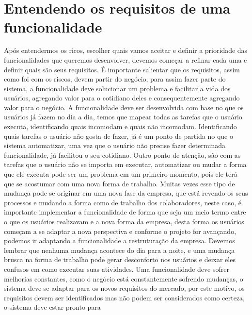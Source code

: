     \section{Entendendo os requisitos de uma funcionalidade}
      Após entendermos os ricos, escolher quais vamos aceitar e definir a prioridade
      das funcionalidades que queremos desenvolver, devemos começar a refinar cada
      uma e definir quais são seus requisitos. É importante salientar que os
      requisitos, assim como foi com os riscos, devem partir do negócio, para assim
      fazer parte do sistema, a funcionalidade deve solucionar um problema e facilitar
      a vida dos usuários, agregando valor para o cotidiano deles e consequentemente
      agregando valor para o negócio. \newline
      A funcionalidade deve ser desenvolvida com base no que os usuários já fazem
      no dia a dia, temos que mapear todas as tarefas que o usuário executa,
      identificando quais incomodam e quais não incomodam. Identificando quais tarefas
      o usuário não gosta de fazer, já é um ponto de partida no que o sistema
      automatizar, uma vez que o usuário não precise fazer determinada funcionalidade,
      já facilitou o seu cotidiano. Outro ponto de atenção, são com as tarefas que
      o usuário não se importa em executar, automatizar ou mudar a forma que ele
      executa pode ser um problema em um primeiro momento, pois ele terá que se
      acostumar com uma nova forma de trabalho. Muitas vezes esse tipo de mudança
      pode se originar em uma nova fase da empresa, que está revendo os seus processos
      e mudando a forma como de trabalho dos colaboradores, neste caso, é importante
      implementar a funcionalidade de forma que seja um meio termo entre o que os
      usuários realizavam e a nova forma da empresa, desta forma os usuários
      começam a se adaptar a nova perspectiva e conforme o projeto for avançando,
      podemos ir adaptando a funcionalidade a restruturação da empresa. Devemos
      lembrar que nenhuma mudança acontece do dia para a noite, e uma mudança
      brusca na forma de trabalho pode gerar desconforto nos usuários e deixar eles
      confusos em como executar suas atividades. \newline
      Uma funcionalidade deve sofrer melhorias constantes, como o negócio está
      constantemente sofrendo mudanças, o sistema deve se adaptar para os novos
      requisitos do mercado, por este motivo, os requisitos devem ser identificados
      mas não podem ser considerados como certeza, o sistema deve estar pronto para
